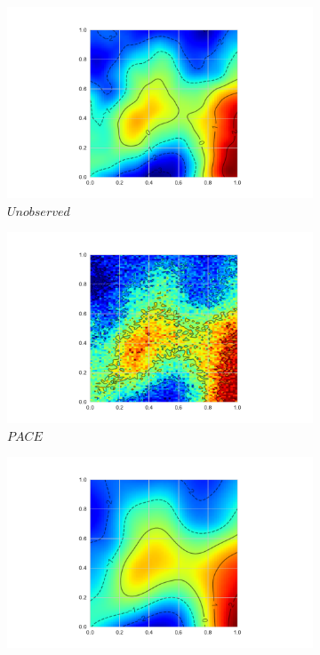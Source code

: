 \begin{figure}
	\centering
	\begin{subfigure}[b]{0.45\textwidth}
		\includegraphics[width=\textwidth]{ftsm_res_recon_example_unob}
		\caption{$Unobserved$}
		\label{fig:ftsm_res_recon_unob}
	\end{subfigure}             
	\begin{subfigure}[b]{0.45\textwidth}
		\includegraphics[width=\textwidth]{ftsm_res_recon_example_pace}
		\caption{$PACE$}
		\label{fig:ftsm_res_recon_pace}
	\end{subfigure}
	\vfill       
	\begin{subfigure}[b]{0.45\textwidth}
		\includegraphics[width=\textwidth]{ftsm_res_recon_example_fpca}

\end{subfigure}
\end{figure}
